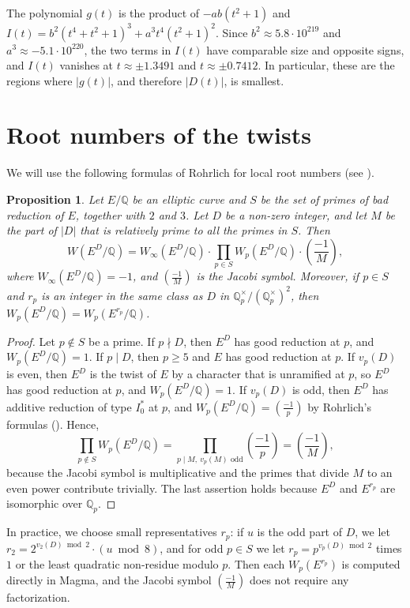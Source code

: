 \documentclass[11pt]{amsart}
\newtheorem{prop}[defn]{Proposition}
\newcommand{\Q}{\mathbb Q}
\newcommand{\kron}[2]{\left(\frac{#1}{#2}\right)}
\begin{document}
The polynomial $g(t)$ is the product of $-ab(t^2+1)$ and $I(t)=b^2(t^4+t^2+1)^3+a^3t^4(t^2+1)^2$. Since $b^2\approx 5.8\cdot 10^{219}$ and $a^3\approx -5.1\cdot 10^{220}$, the two terms in $I(t)$ have comparable size and opposite signs, and $I(t)$ vanishes at $t\approx \pm 1.3491$ and $t\approx \pm 0.7412$. In particular, these are the regions where $|g(t)|$, and therefore $|D(t)|$, is smallest.

\section{Root numbers of the twists}\label{sec-rootnumbers}

 We will use the following formulas of Rohrlich for local root numbers (see \cite{rohrlichvariation}).

\begin{prop}\label{prop-rootnumber}
Let $E/\Q$ be an elliptic curve and $S$ be the set of primes of bad reduction of $E$, together with $2$ and $3$. Let $D$ be a non-zero integer, and let $M$ be the part of $|D|$ that is relatively prime to all the primes in $S$. Then
$$W(E^D/\Q)=W_\infty(E^D/\Q)\cdot\prod_{p\in S}W_p(E^D/\Q)\cdot\kron{-1}{M},$$
where $W_\infty(E^D/\Q)=-1$, and $\kron{-1}{M}$ is the Jacobi symbol. Moreover, if $p\in S$ and $r_p$ is an integer in the same class as $D$ in $\Q_p^\times/(\Q_p^\times)^2$, then $W_p(E^D/\Q)=W_p(E^{r_p}/\Q)$.
\end{prop}

\begin{proof}
Let $p\not\in S$ be a prime. If $p\nmid D$, then $E^D$ has good reduction at $p$, and $W_p(E^D/\Q)=1$. If $p\mid D$, then $p\geq 5$ and $E$ has good reduction at $p$. If $v_p(D)$ is even, then $E^D$ is the twist of $E$ by a character that is unramified at $p$, so $E^D$ has good reduction at $p$, and $W_p(E^D/\Q)=1$. If $v_p(D)$ is odd, then $E^D$ has additive reduction of type $I_0^*$ at $p$, and $W_p(E^D/\Q)=\kron{-1}{p}$ by Rohrlich's formulas (\cite{rohrlichvariation}). Hence,
$$\prod_{p\not\in S}W_p(E^D/\Q)=\prod_{p\mid M,\ v_p(M) \text{ odd}}\kron{-1}{p}=\kron{-1}{M},$$
because the Jacobi symbol is multiplicative and the primes that divide $M$ to an even power contribute trivially. The last assertion holds because $E^D$ and $E^{r_p}$ are isomorphic over $\Q_p$.
\end{proof}

In practice, we choose small representatives $r_p$: if $u$ is the odd part of $D$, we let $r_2=2^{v_2(D)\bmod 2}\cdot(u\bmod 8)$, and for odd $p\in S$ we let $r_p=p^{v_p(D)\bmod 2}$ times $1$ or the least quadratic non-residue modulo $p$. Then each $W_p(E^{r_p})$ is computed directly in Magma, and the Jacobi symbol $\kron{-1}{M}$ does not require any factorization.
\end{document}
